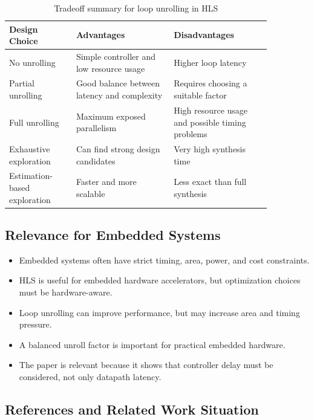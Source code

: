 \documentclass[conference]{IEEEtran}
\begin{document}
\begin{table}[h]
\centering
\caption{Tradeoff summary for loop unrolling in HLS}
\begin{tabular}{|p{0.22\linewidth}|p{0.32\linewidth}|p{0.32\linewidth}|}
\hline
\textbf{Design Choice} & \textbf{Advantages} & \textbf{Disadvantages} \\
\hline
No unrolling & Simple controller and low resource usage & Higher loop latency \\
\hline
Partial unrolling & Good balance between latency and complexity & Requires choosing a suitable factor \\
\hline
Full unrolling & Maximum exposed parallelism & High resource usage and possible timing problems \\
\hline
Exhaustive exploration & Can find strong design candidates & Very high synthesis time \\
\hline
Estimation-based exploration & Faster and more scalable & Less exact than full synthesis \\
\hline
\end{tabular}
\end{table}

\subsection{Relevance for Embedded Systems}

\begin{itemize}
    \item Embedded systems often have strict timing, area, power, and cost constraints.
    \item HLS is useful for embedded hardware accelerators, but optimization choices must be hardware-aware.
    \item Loop unrolling can improve performance, but may increase area and timing pressure.
    \item A balanced unroll factor is important for practical embedded hardware.
    \item The paper is relevant because it shows that controller delay must be considered, not only datapath latency.
\end{itemize}

\subsection{References and Related Work Situation}
\end{document}
